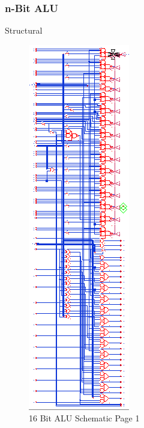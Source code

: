 \documentclass[11pt]{article}
\begin{document}
		\subsubsection{n-Bit ALU}
		
			Structural
			
			
			\begin{figure}[H]
				\centering
				\includegraphics[width=0.7\linewidth]{"Pictures/ALU-16Bit Schematic 1"}
				\caption{16 Bit ALU Schematic Page 1}
				\label{fig:alu-16bit-schematic-1}
			\end{figure}
		
\end{document}
